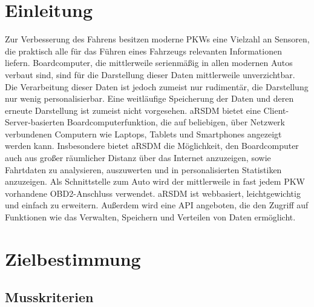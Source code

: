 \documentclass[pflichtenheft.tex]{subfiles}
\begin{document}
\chapter{Einleitung}

Zur Verbesserung des Fahrens besitzen moderne PKWs eine Vielzahl an Sensoren, die praktisch alle für das Führen eines Fahrzeugs relevanten Informationen liefern. Boardcomputer, die mittlerweile serienmäßig in allen modernen Autos verbaut sind, sind für die Darstellung dieser Daten mittlerweile unverzichtbar. Die Verarbeitung dieser Daten ist jedoch zumeist nur rudimentär, die Darstellung nur wenig personalisierbar. Eine weitläufige Speicherung der Daten und deren erneute Darstellung ist zumeist nicht vorgesehen. aRSDM bietet eine Client-Server-basierten Boardcomputerfunktion, die auf beliebigen, über Netzwerk verbundenen Computern wie Laptops, Tablets und Smartphones angezeigt werden kann. Insbesondere bietet aRSDM die Möglichkeit, den Boardcomputer auch aus großer räumlicher Distanz über das Internet anzuzeigen, sowie Fahrtdaten zu analysieren, auszuwerten und in personalisierten Statistiken anzuzeigen. Als Schnittstelle zum Auto wird der mittlerweile in fast jedem PKW vorhandene OBD2-Anschluss verwendet. aRSDM ist webbasiert, leichtgewichtig und einfach zu erweitern. Außerdem wird eine API angeboten, die den Zugriff auf Funktionen wie das Verwalten, Speichern und Verteilen von Daten ermöglicht. 

\chapter{Zielbestimmung}

\section{Musskriterien}

\renewcommand{\theenumi}{/MK\ifnum \value{enumi}<10 0\fi\arabic{enumi}0/}
\renewcommand{\labelenumi}{\theenumi}
\renewcommand{\theenumii}{\arabic{enumii}}
\renewcommand{\labelenumii}{/MK\ifnum \value{enumi}<10 0\fi\arabic{enumi}\arabic{enumii}/}
\end{document}
